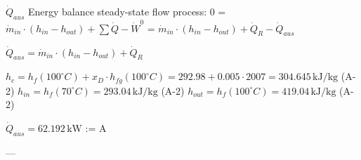 \( \dot{Q}_{aus} \)  
Energy balance steady-state flow process:  
0 = \( \dot{m}_{in} \cdot (h_{in} - h_{out}) + \sum \dot{Q} - \dot{W}^0 \)  
= \( \dot{m}_{in} \cdot (h_{in} - h_{out}) + \dot{Q}_R - \dot{Q}_{aus} \)  

\( \dot{Q}_{aus} = \dot{m}_{in} \cdot (h_{in} - h_{out}) + \dot{Q}_R \)  

\( h_c = h_{f}(100^\circ C) + x_D \cdot h_{fg}(100^\circ C) = 292.98 + 0.005 \cdot 2007 = 304.645 \, \text{kJ/kg} \) (A-2)  
\( h_{in} = h_{f}(70^\circ C) = 293.04 \, \text{kJ/kg} \) (A-2)  
\( h_{out} = h_{f}(100^\circ C) = 419.04 \, \text{kJ/kg} \) (A-2)  

\( \dot{Q}_{aus} = 62.192 \, \text{kW} \) := A  

---